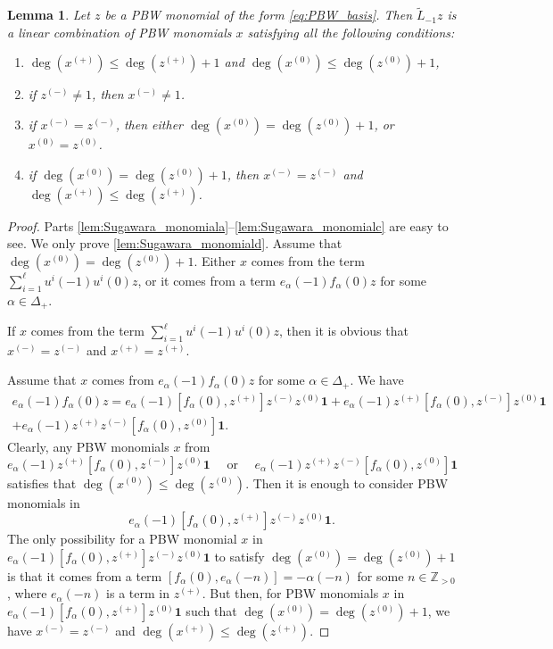 \documentclass[JEP,XML,SOM,Unicode]{cedram}
\newenvironment{enumeratea}
{\bgroup\def\theenumi{\alph{enumi}}\begin{enumerate}}
{\end{enumerate}\egroup}
\let\al\alpha
\newcommand\Z{{\mathbb Z}}
\newtheorem{lem}[theorem]{Lemma}
\theoremstyle{definition}
\begin{document}
\begin{lem}
\label{lem:Sugawara_monomial}
Let $z$ be a PBW monomial of the form \eqref{eq:PBW_basis}.
Then $\tilde L_{-1} z$
is a linear combination of PBW monomials
$x$ satisfying all the following conditions:
\begin{enumeratea}
\item\label{lem:Sugawara_monomiala}
$\deg(x^{(+)}) \leq \deg(z^{(+)})+1$ and $\deg(x^{(0)}) \leq \deg(z^{(0)})+1$,
\item\label{lem:Sugawara_monomialb}
if $z^{(-)}\neq 1$, then $x^{(-)}\neq 1$.
\item\label{lem:Sugawara_monomialc}
if $x^{(-)}=z^{(-)}$, then either $\deg(x^{(0)}) =\deg(z^{(0)}) +1$, or $x^{(0)} = z^{(0)}$.
\item\label{lem:Sugawara_monomiald}
if $\deg(x^{(0)}) =\deg(z^{(0)}) +1$, then $x^{(-)}= z^{(-)}$ and $\deg(x^{(+)}) \leq \deg(z^{(+)})$.
\end{enumeratea}
\end{lem}
\begin{proof}
Parts \eqref{lem:Sugawara_monomiala}--\eqref{lem:Sugawara_monomialc} are easy to see. We only prove \eqref{lem:Sugawara_monomiald}. Assume that $\deg(x^{(0)}) =\deg(z^{(0)}) +1$.
Either $x$ comes from the term $\sum_{i=1}^{\ell} u^i(-1)u^i(0) z$,
or it comes from a term $e_{\al}(-1)f_{\al}(0)z$ for some $\al \in \Delta_+$.

If $x$ comes from the term $\sum_{i=1}^{\ell} u^i(-1)u^i(0) z$, then it is obvious that
$x^{(-)}= z^{(-)}$ and $x^{(+)} = z^{(+)}$.

Assume that $x$ comes from $e_{\al}(-1)f_{\al}(0)z$ for some $\al \in \Delta_+$.
We have
\begin{multline*}
e_{\al}(-1)f_{\al}(0)z = e_{\al}(-1) [f_{\al}(0), z^{(+)}]z^{(-)}z^{(0)}\mathbf{1} + e_{\al}(-1)z^{(+)}[f_{\al}(0), z^{(-)}]z^{(0)} \mathbf{1} \\
+ e_{\al}(-1)z^{(+)} z^{(-)}[f_{\al}(0),z^{(0)} ] \mathbf{1}.
\end{multline*}
Clearly, any PBW monomials $x$ from
\[
e_{\al}(-1)z^{(+)}[f_{\al}(0), z^{(-)}]z^{(0)} \mathbf{1} \quad \text{ or }
\quad e_{\al}(-1)z^{(+)} z^{(-)}[f_{\al}(0),z^{(0)} ] \mathbf{1}
\]
satisfies that $\deg(x^{(0)}) \leq \deg(z^{(0)})$. Then it is enough to consider PBW monomials in
\[
e_{\al}(-1) [f_{\al}(0), z^{(+)}]z^{(-)}z^{(0)}\mathbf{1}.
\]
The only possibility for a PBW monomial $x$ in $ e_{\al}(-1) [f_{\al}(0), z^{(+)}]z^{(-)}z^{(0)}\mathbf{1}$
to satisfy $\deg(x^{(0)}) =\deg(z^{(0)}) +1$ is that it comes from a term
$ [f_{\al}(0), e_{\al}(-n)]= - \al(-n)$ for some $n \in \Z_{>0}$, where
$e_{\al}(-n)$ is a term in $z^{(+)}$.
But then, for PBW monomials $x$ in
$ e_{\al}(-1)[f_{\al}(0), z^{(+)}]z^{(0)}\mathbf{1}$
such that $\deg(x^{(0)}) =\deg(z^{(0)}) +1$,
we have $x^{(-)}=z^{(-)}$ and $\deg(x^{(+)}) \leq \deg(z^{(+)})$.
\end{proof}
\end{document}
